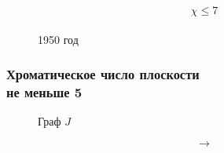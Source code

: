 \documentclass[14pt]{beamer}
\begin{document}
\begin{frame}
\begin{figure}[h]
\begin{minipage}[h]{0.49\linewidth}
    $$\chi \le 7 $$ \\ 1950 год
  \end{minipage}
\end{figure}
\end{frame}

\begin{frame}
\frametitle{Хроматическое число плоскости \\ не меньше 5}

\begin{figure}[h]
  \begin{minipage}[h]{0.2\linewidth}
    Граф $J$
  \end{minipage}
  \begin{minipage}[h]{0.05\linewidth}
  \vspace{-1cm}$$\to $$
  \end{minipage}
  \begin{minipage}[h]{0.2\linewidth}

\end{minipage}
\end{figure}
\end{frame}
\end{document}
